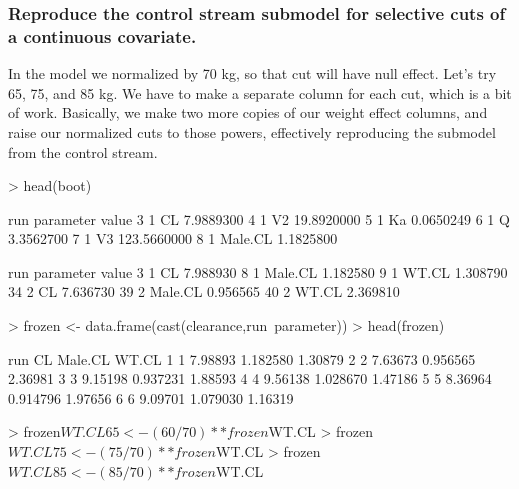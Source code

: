 \subsubsection{Reproduce the control stream submodel for selective cuts of a continuous covariate.}
In the model we normalized by 70 kg, so that cut will have null effect.
Let's try 65, 75, and 85 kg. We have to make a separate column for each
cut, which is a bit of work. Basically, we make two more copies of our
weight effect columns, and raise our normalized cuts to those powers, 
effectively reproducing the submodel from the control stream.
\begin{Schunk}
\begin{Sinput}
> head(boot) 
\end{Sinput}
\begin{Soutput}
  run parameter       value
3   1        CL   7.9889300
4   1        V2  19.8920000
5   1        Ka   0.0650249
6   1         Q   3.3562700
7   1        V3 123.5660000
8   1   Male.CL   1.1825800
\end{Soutput}
\begin{Soutput}
   run parameter    value
3    1        CL 7.988930
8    1   Male.CL 1.182580
9    1     WT.CL 1.308790
34   2        CL 7.636730
39   2   Male.CL 0.956565
40   2     WT.CL 2.369810
\end{Soutput}
\begin{Sinput}
> frozen <- data.frame(cast(clearance,run~parameter))
> head(frozen)
\end{Sinput}
\begin{Soutput}
  run      CL  Male.CL   WT.CL
1   1 7.98893 1.182580 1.30879
2   2 7.63673 0.956565 2.36981
3   3 9.15198 0.937231 1.88593
4   4 9.56138 1.028670 1.47186
5   5 8.36964 0.914796 1.97656
6   6 9.09701 1.079030 1.16319
\end{Soutput}
\begin{Sinput}
> frozen$WT.CL65 <- (60/70)**frozen$WT.CL
> frozen$WT.CL75 <- (75/70)**frozen$WT.CL
> frozen$WT.CL85 <- (85/70)**frozen$WT.CL
\end{Sinput}
\end{Schunk}
